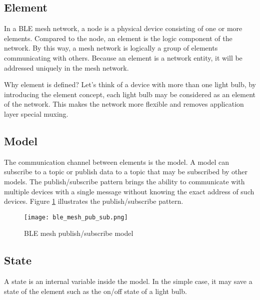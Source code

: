 \documentclass[./main.tex]{subfiles}
\begin{document}
\subsection{Element}
In a BLE mesh network, a node is a physical device consisting of one or more elements. Compared to the node, an element is the logic component of the network. By this way, a mesh network is logically a group of elements communicating with others. Because an element is a network entity, it will be addressed uniquely in the mesh network.

Why element is defined? Let's think of a device with more than one light bulb, by introducing the element concept, each light bulb may be considered as an element of the network. This makes the network more flexible and removes application layer special muxing.

\subsection{Model}
The communication channel between elements is the model. A model can subscribe to a topic or publish data to a topic that may be subscribed by other models. The publish/subscribe pattern brings the ability to  communicate with multiple devices with a single message without knowing the exact address of such devices. Figure \ref{fig:BLE mesh publish/subscribe model} illustrates the publish/subscribe pattern. 

\begin{figure}[ht]
    \begin{center}
        \texttt{[image: ble\_mesh\_pub\_sub.png]}
    \end{center}
    \caption{BLE mesh publish/subscribe model}
    \label{fig:BLE mesh publish/subscribe model}
\end{figure}

\subsection{State}
A state is an internal variable inside the model. In the simple case, it may save a state of the element such as the on/off state of a light bulb.
\end{document}
